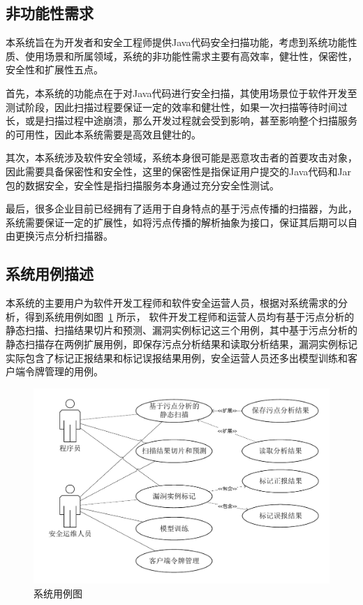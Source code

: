\subsection{非功能性需求}
本系统旨在为开发者和安全工程师提供Java代码安全扫描功能，考虑到系统功能性质、使用场景和所属领域，系统的非功能性需求主要有高效率，健壮性，保密性，安全性和扩展性五点。

首先，本系统的功能点在于对Java代码进行安全扫描，其使用场景位于软件开发至测试阶段，因此扫描过程要保证一定的效率和健壮性，如果一次扫描等待时间过长，或是扫描过程中途崩溃，那么开发过程就会受到影响，甚至影响整个扫描服务的可用性，因此本系统需要是高效且健壮的。

其次，本系统涉及软件安全领域，系统本身很可能是恶意攻击者的首要攻击对象，因此需要具备保密性和安全性，这里的保密性是指保证用户提交的Java代码和Jar包的数据安全，安全性是指扫描服务本身通过充分安全性测试。

最后，很多企业目前已经拥有了适用于自身特点的基于污点传播的扫描器，为此，系统需要保证一定的扩展性，如将污点传播的解析抽象为接口，保证其后期可以自由更换污点分析扫描器。

\subsection{系统用例描述}\label{sec:case}
本系统的主要用户为软件开发工程师和软件安全运营人员，根据对系统需求的分析，得到系统用例如图~\ref{fig:case} 所示， 软件开发工程师和运营人员均有基于污点分析的静态扫描、扫描结果切片和预测、漏洞实例标记这三个用例，其中基于污点分析的静态扫描存在两例扩展用例，即保存污点分析结果和读取分析结果，漏洞实例标记实际包含了标记正报结果和标记误报结果用例，安全运营人员还多出模型训练和客户端令牌管理的用例。

\begin{figure}[!htbp]
	\centering
	\includegraphics[width=5in]{FIGs/chapter3/case.pdf}
	\caption{系统用例图}\label{fig:case}
\end{figure}

